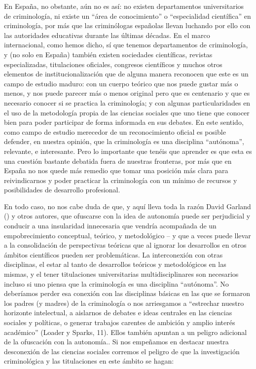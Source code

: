 \documentclass[
  spanish,
  letterpaper,
  DIV=11,
  numbers=noendperiod]{scrreprt}
\begin{document}
En España, no obstante, aún no es así: no existen departamentos
universitarios de criminología, ni existe un ``área de conocimiento'' o
``especialidad científica'' en criminología, por más que las
criminólogas españolas llevan luchando por ello con las autoridades
educativas durante las últimas décadas. En el marco internacional, como
hemos dicho, sí que tenemos departamentos de criminología, y (no solo en
España) también existen sociedades científicas, revistas especializadas,
titulaciones oficiales, congresos científicos y muchos otros elementos
de institucionalización que de alguna manera reconocen que este es un
campo de estudio maduro: con un cuerpo teórico que nos puede gustar más
o menos, y nos puede parecer más o menos original pero que es centenario
y que es necesario conocer si se practica la criminología; y con algunas
particularidades en el uso de la metodología propia de las ciencias
sociales que uno tiene que conocer bien para poder participar de forma
informada en sus debates. En este sentido, como campo de estudio
merecedor de un reconocimiento oficial es posible defender, en nuestra
opinión, que la criminología es una disciplina ``autónoma'', relevante,
e interesante. Pero lo importante que tenéis que aprender es que esta es
una cuestión bastante debatida fuera de nuestras fronteras, por más que
en España no nos quede más remedio que tomar una posición más clara para
reivindicarnos y poder practicar la criminología con un mínimo de
recursos y posibilidades de desarrollo profesional.

En todo caso, no nos cabe duda de que, y aquí lleva toda la razón David
Garland () y otros autores, que ofuscarse con la idea de autonomía puede
ser perjudicial y conducir a una insularidad innecesaria que vendría
acompañada de un empobrecimiento conceptual, teórico, y metodológico --
y que a veces puede llevar a la consolidación de perspectivas teóricas
que al ignorar los desarrollos en otros ámbitos científicos pueden ser
problemáticas. La interconexión con otras disciplinas, el estar al tanto
de desarrollos teóricos y metodológicos en las mismas, y el tener
titulaciones universitarias multidisciplinares son necesarios incluso si
uno piensa que la criminología es una disciplina ``autónoma''. No
deberíamos perder esa conexión con las disciplinas básicas en las que se
formaron los padres (y madres) de la criminología o nos arriesgamos a
``estrechar nuestro horizonte intelectual, a aislarnos de debates e
ideas centrales en las ciencias sociales y políticas, o generar trabajos
carentes de ambición y amplio interés académico'' (Loader y Sparks, 11).
Ellos también apuntan a un peligro adicional de la ofuscación con la
autonomía.. Si nos empeñamos en destacar nuestra desconexión de las
ciencias sociales corremos el peligro de que la investigación
criminológica y las titulaciones en este ámbito se hagan:
\end{document}
